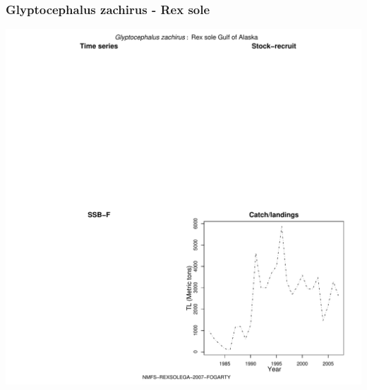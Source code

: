 \subsubsection{Glyptocephalus zachirus - Rex sole}
\begin{center}
\includegraphics[width=1.2\textwidth]{../R/figures/NMFS-REXSOLEGA-2007-FOGARTY.pdf}
\end{center}

